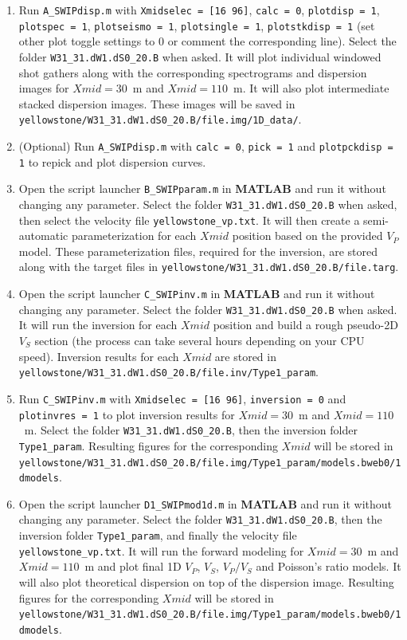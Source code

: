 \documentclass[twoside,a4paper]{article}
\def\MATLAB{\textbf{MATLAB}}
\begin{document}
\begin{enumerate}[leftmargin=*]
\item Run \verb|A_SWIPdisp.m| with \verb|Xmidselec = [16 96]|, \verb|calc = 0|, \verb|plotdisp = 1|, \verb|plotspec = 1|, \verb|plotseismo = 1|, \verb|plotsingle = 1|, \verb|plotstkdisp = 1| (set other plot toggle settings to 0 or comment the corresponding line). Select the folder \verb|W31_31.dW1.dS0_20.B| when asked. It will plot individual windowed shot gathers along with the corresponding spectrograms and dispersion images for $Xmid = 30$~m and $Xmid = 110$~m. It will also plot intermediate stacked dispersion images. These images will be saved in \verb|yellowstone/W31_31.dW1.dS0_20.B/file.img/1D_data/|.

\item (Optional) Run \verb|A_SWIPdisp.m| with \verb|calc = 0|, \verb|pick = 1| and \verb|plotpckdisp = 1| to repick and plot dispersion curves.

\item Open the script launcher \verb|B_SWIPparam.m| in {\MATLAB} and run it without changing any parameter. Select the folder \verb|W31_31.dW1.dS0_20.B| when asked, then select the velocity file \verb|yellowstone_vp.txt|. It will then create a semi-automatic parameterization for each $Xmid$ position based on the provided $V_P$ model. These parameterization files, required for the inversion, are stored along with the target files in \verb|yellowstone/W31_31.dW1.dS0_20.B/file.targ|.

\item Open the script launcher \verb|C_SWIPinv.m| in {\MATLAB} and run it without changing any parameter. Select the folder \verb|W31_31.dW1.dS0_20.B| when asked. It will run the inversion for each $Xmid$ position and build a rough pseudo-2D $V_S$ section (the process can take several hours depending on your CPU speed). Inversion results for each $Xmid$ are stored in \verb|yellowstone/W31_31.dW1.dS0_20.B/file.inv/Type1_param|.

\item Run \verb|C_SWIPinv.m| with \verb|Xmidselec = [16 96]|, \verb|inversion = 0| and \verb|plotinvres = 1| to plot inversion results for $Xmid = 30$~m and $Xmid = 110$~m. Select the folder \verb|W31_31.dW1.dS0_20.B|, then the inversion folder \verb|Type1_param|. Resulting figures for the corresponding $Xmid$ will be stored in \verb|yellowstone/W31_31.dW1.dS0_20.B/file.img/Type1_param/models.bweb0/1dmodels|.

\item Open the script launcher \verb|D1_SWIPmod1d.m| in {\MATLAB} and run it without changing any parameter. Select the folder \verb|W31_31.dW1.dS0_20.B|, then the inversion folder \verb|Type1_param|, and finally the velocity file \verb|yellowstone_vp.txt|. It will run the forward modeling for $Xmid = 30$~m and $Xmid = 110$~m and plot final 1D $V_P$, $V_S$, $V_P/V_S$ and Poisson's ratio models. It will also plot theoretical dispersion on top of the dispersion image. Resulting figures for the corresponding $Xmid$ will be stored in \verb|yellowstone/W31_31.dW1.dS0_20.B/file.img/Type1_param/models.bweb0/1dmodels|.


\end{enumerate}
\end{document}
